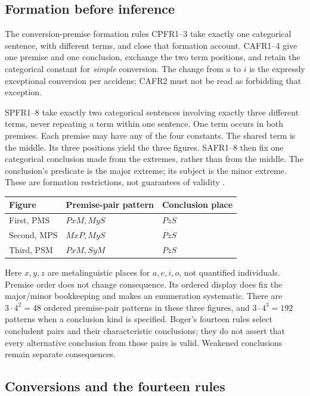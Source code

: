 \subsection{Formation before inference}
\label{sec:p13-boger-deduction-formation}

The conversion-premise formation rules CPFR1--3 take exactly one categorical
sentence, with different terms, and close that formation account. CAFR1--4
give one premise and one conclusion, exchange the two term positions, and
retain the categorical constant for \emph{simple} conversion. The change from
\(a\) to \(i\) is the expressly exceptional conversion per accidens; CAFR2
must not be read as forbidding that exception.

SPFR1--8 take exactly two categorical sentences involving exactly three
different terms, never repeating a term within one sentence. One term occurs
in both premises. Each premise may have any of the four constants. The shared
term is the middle. Its three positions yield the three figures. SAFR1--8
then fix one categorical conclusion made from the extremes, rather than from
the middle. The conclusion's predicate is the major extreme; its subject is
the minor extreme. These are formation restrictions, not guarantees of validity
\parencite[pp.~167--175]{Boger2004UnderlyingLogic}.

\begin{tabularx}{\textwidth}{@{}l X X@{}}
\toprule
Figure & Premise-pair pattern & Conclusion place\\
\midrule
First, PMS & \(PxM,MyS\) & \(PzS\)\\
Second, MPS & \(MxP,MyS\) & \(PzS\)\\
Third, PSM & \(PxM,SyM\) & \(PzS\)\\
\bottomrule
\end{tabularx}

Here \(x,y,z\) are metalinguistic places for \(a,e,i,o\), not quantified
individuals. Premise order does not change consequence. Its ordered display
does fix the major/minor bookkeeping and makes an enumeration systematic.
There are \(3\cdot4^2=48\) ordered premise-pair patterns in these three figures,
and \(3\cdot4^3=192\) patterns when a conclusion kind is specified. Boger's
fourteen rules select concludent pairs and their characteristic conclusions;
they do not assert that every alternative conclusion from those pairs is valid.
Weakened conclusions remain separate consequences.

\subsection{Conversions and the fourteen rules}
\label{sec:p13-boger-deduction-rules}

